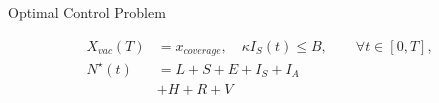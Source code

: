 \begin{frame}{Optimal Control Problem}
\begin{textblock*}{60mm}
{\begin{equation*}
\begin{aligned}
                X_{vac}(T) &= x_{coverage},
                \quad
                \kappa I_S(t) \leq B, \qquad
                \forall t \in [0, T],
                \\
                N^{\star}(t) &=
                    L + S +E + I_S + I_A 
                \\
                   &
                    +
                    H + R + V
                \end{aligned}
            \end{equation*}
        }
    \end{textblock*}
\end{frame}